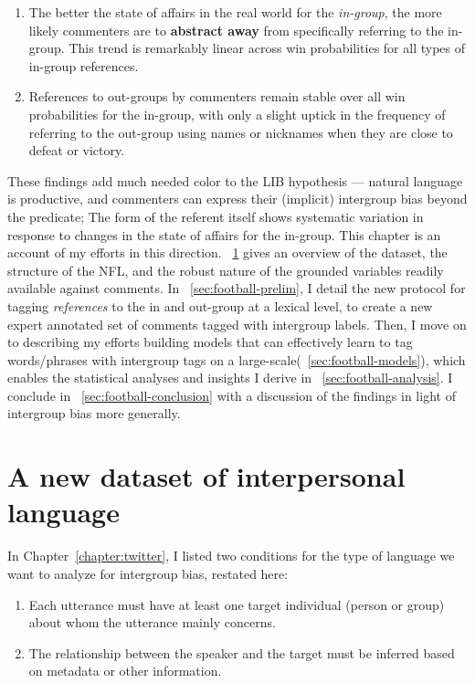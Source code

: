 \begin{enumerate}
    \item The better the state of affairs in the real world for the \emph{in-group}, the more likely commenters are to \textbf{abstract away} from specifically referring to the in-group. This trend is remarkably linear across win probabilities for all types of in-group references.
    \item References to out-groups by commenters remain stable over all win probabilities for the in-group, with only a slight uptick in the frequency of referring to the out-group using names or nicknames when they are close to defeat or victory.
\end{enumerate}

These findings add much needed color to the LIB hypothesis --- natural language is productive, and commenters can express their (implicit) intergroup bias beyond the predicate; The form of the referent itself shows systematic variation in response to changes in the state of affairs for the in-group. This chapter is an account of my efforts in this direction. \textsection~\ref{sec:football-data} gives an overview of the dataset, the structure of the NFL, and the robust nature of the grounded variables readily available against comments. In \textsection~\ref{sec:football-prelim}, I detail the new protocol for tagging \emph{references} to the in and out-group at a lexical level, to create a new expert annotated set of comments tagged with intergroup labels. Then, I move on to describing my efforts building models that can effectively learn to tag words/phrases with intergroup tags on a large-scale(\textsection~\ref{sec:football-models}), which enables the statistical analyses and insights I derive in \textsection~\ref{sec:football-analysis}. I conclude in \textsection~\ref{sec:football-conclusion} with a discussion of the findings in light of intergroup bias more generally.

\section{A new dataset of interpersonal language}
\label{sec:football-data}

In Chapter~\ref{chapter:twitter}, I listed two conditions for the type of language we want to analyze for intergroup bias, restated here:

\begin{enumerate}
    \item Each utterance must have at least one target individual (person or group) about whom the utterance mainly concerns.
    \item The relationship between the speaker and the target must be inferred based on metadata or other information.
\end{enumerate}

